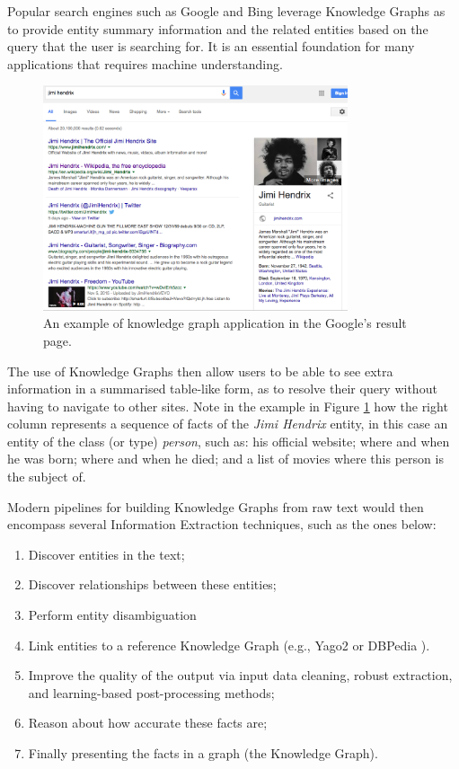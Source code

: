 \documentclass[11pt,a4paper,openright]{memoir}
\begin{document}
Popular search engines such as Google \cite{google} and Bing \cite{bing} leverage Knowledge Graphs as to provide entity summary information and the related entities based on the query that the user is searching for. It is an essential foundation for many applications that requires machine understanding.

\begin{figure}[!htbp]
  \centering
    \includegraphics[width=0.8\textwidth]{./images/google_knowledge_graph}
  \caption[An example of knowledge graph application.]{An example of knowledge graph application in the Google's result page.}
  \label{fig:google_knowledge_graph}
\end{figure}

The use of Knowledge Graphs then allow users to be able to see extra information in a summarised table-like form, as to resolve their query without having to navigate to other sites. Note in the example in Figure \ref{fig:google_knowledge_graph} how the right column represents a sequence of facts of the \emph{Jimi Hendrix} entity, in this case an entity of the class (or type) \emph{person}, such as: his official website; where and when he was born; where and when he died; and a list of movies where this person is the subject of.

Modern pipelines for building Knowledge Graphs from raw text would then encompass several Information Extraction techniques, such as the ones below:
\begin{enumerate}
  \item Discover entities in the text;
  \item Discover relationships between these entities;
  \item Perform entity disambiguation
  \item Link entities to a reference Knowledge Graph (e.g., Yago2 \cite{Suchanek2007} or DBPedia \cite{dbpedia-swj}).
  \item Improve the quality of the output via input data cleaning, robust extraction, and learning-based post-processing methods;
  \item Reason about how accurate these facts are;
  \item Finally presenting the facts in a graph (the Knowledge Graph).
\end{enumerate}
\end{document}
